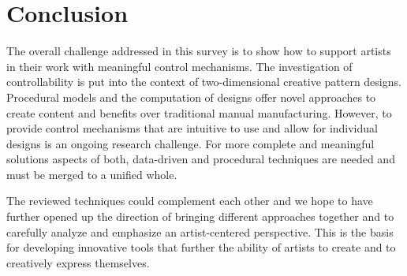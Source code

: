 

\section{Conclusion}
\label{sec:conclusion}


The overall challenge addressed in this survey is to show how to support artists in their work with meaningful control mechanisms. The investigation of controllability is put into the context of two-dimensional creative pattern designs. Procedural models and the computation of designs offer novel approaches to create content and benefits over traditional manual manufacturing. However, to provide control mechanisms that are intuitive to use and allow for individual designs is an ongoing research challenge. For more complete and meaningful solutions aspects of both, data-driven and procedural techniques are needed and must be merged to a unified whole.  

The reviewed techniques could complement each other and we hope to have further opened up the direction of bringing different approaches together and to carefully analyze and emphasize an artist-centered perspective. This is the basis for developing innovative tools that further the ability of artists to create and to creatively express themselves.



